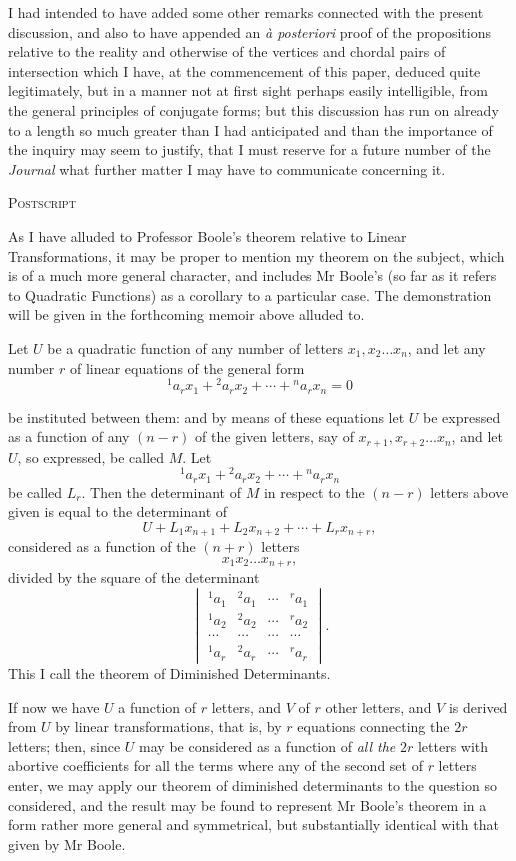 \documentclass[11pt]{article}
\newcommand{\subpaperhead}[1]{\begin{center}{\large\scshape #1}\end{center}}
\newcommand{\sourcepage}[1]{\marginpar{\scriptsize p.~#1}}
\begin{document}
{{I had intended to have added some other remarks connected with the present discussion, and also to have appended an \emph{\`a posteriori} proof of the propositions relative to the reality and otherwise of the vertices and chordal pairs of intersection which I have, at the commencement of this paper, deduced quite legitimately, but in a manner not at first sight perhaps easily intelligible, from the general principles of conjugate forms; but this discussion has run on already to a length so much greater than I had anticipated and than the importance of the inquiry may seem to justify, that I must reserve for a future number of the \emph{Journal} what further matter I may have to communicate concerning it.

\subpaperhead{Postscript}

As I have alluded to Professor Boole's theorem relative to Linear Transformations, it may be proper to mention my theorem on the subject, which is of a much more general character, and includes Mr Boole's (so far as it refers to Quadratic Functions) as a corollary to a particular case. The demonstration will be given in the forthcoming memoir above alluded to.

Let $U$ be a quadratic function of any number of letters $x_1,x_2\ldots x_n$, and let any number $r$ of linear equations of the general form
\[
{}^{1}a_r x_1+{}^{2}a_r x_2+\cdots+{}^{n}a_r x_n=0
\]

\sourcepage{136}
be instituted between them: and by means of these equations let $U$ be expressed as a function of any $(n-r)$ of the given letters, say of $x_{r+1},x_{r+2}\ldots x_n$, and let $U$, so expressed, be called $M$. Let
\[
{}^{1}a_r x_1+{}^{2}a_r x_2+\cdots+{}^{n}a_r x_n
\]
be called $L_r$. Then the determinant of $M$ in respect to the $(n-r)$ letters above given is equal to the determinant of
\[
U+L_1x_{n+1}+L_2x_{n+2}+\cdots+L_rx_{n+r},
\]
considered as a function of the $(n+r)$ letters
\[
x_1x_2\ldots x_{n+r},
\]
divided by the square of the determinant
\[
\begin{vmatrix}
{}^{1}a_1&{}^{2}a_1&\cdots&{}^{r}a_1\\
{}^{1}a_2&{}^{2}a_2&\cdots&{}^{r}a_2\\
\cdots&\cdots&\cdots&\cdots\\
{}^{1}a_r&{}^{2}a_r&\cdots&{}^{r}a_r
\end{vmatrix}.
\]
This I call the theorem of Diminished Determinants.

If now we have $U$ a function of $r$ letters, and $V$ of $r$ other letters, and $V$ is derived from $U$ by linear transformations, that is, by $r$ equations connecting the $2r$ letters; then, since $U$ may be considered as a function of \emph{all the} $2r$ letters with abortive coefficients for all the terms where any of the second set of $r$ letters enter, we may apply our theorem of diminished determinants to the question so considered, and the result may be found to represent Mr Boole's theorem in a form rather more general and symmetrical, but substantially identical with that given by Mr Boole.

}}
\end{document}
